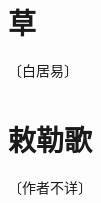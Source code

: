 \documentclass[12pt,UTF-8,openany]{ctexbook}
\begin{document}
\section{草}

\begin{center}
    \vspace{10pt}
    
    \begin{normalsize}
        
        〔白居易〕
        
    \end{normalsize}
    
    \vspace{8pt}
    
    \begin{large}
        
        
        
    \end{large}
    
\end{center}

\vspace{8pt}


\section{敕勒歌}

\begin{center}
    \vspace{10pt}
    
    \begin{normalsize}
        
        〔作者不详〕
        
    \end{normalsize}
    
    \vspace{8pt}
    
    \begin{large}
        
        
        
        
        
    \end{large}
    
\end{center}
\end{document}
